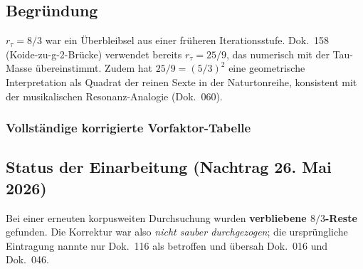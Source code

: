 \subsection*{Begründung}

$r_\tau = 8/3$ war ein Überbleibsel aus einer früheren Iterationsstufe.
Dok.~158 (Koide-zu-g-2-Brücke) verwendet bereits $r_\tau = 25/9$, das
numerisch mit der Tau-Masse übereinstimmt. Zudem hat $25/9 = (5/3)^2$
eine geometrische Interpretation als Quadrat der reinen Sexte in der
Naturtonreihe, konsistent mit der musikalischen Resonanz-Analogie
(Dok.~060).

\subsubsection*{Vollständige korrigierte Vorfaktor-Tabelle}

\begin{center}
{\footnotesize
{}
} %
\end{center}

\subsection*{Status der Einarbeitung (Nachtrag 26. Mai 2026)}

Bei einer erneuten korpusweiten Durchsuchung wurden \textbf{verbliebene
$8/3$-Reste} gefunden. Die Korrektur war also \emph{nicht sauber
durchgezogen}; die ursprüngliche Eintragung nannte nur Dok.~116 als
betroffen und übersah Dok.~016 und Dok.~046.

\begin{center}
{\footnotesize
{}
} %
\end{center}


